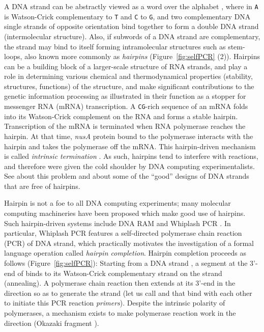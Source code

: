 \documentclass{article}
\theoremstyle{plain}
\theoremstyle{remark}
\begin{document}
A DNA strand can be abstractly viewed as a word over the alphabet , where in {\tt A} is Watson-Crick complementary to {\tt T} and {\tt C} to {\tt G}, and two complementary DNA single strands of opposite orientation bind together to form a double DNA strand (intermolecular structure). 
Also, if subwords of a DNA strand are complementary, the strand may bind to itself forming intramolecular structures such as stem-loops, also known more commonly as {\it hairpins} (Figure~\ref{fig:selfPCR} (2)). 
Hairpins can be a building block of a larger-scale structure of RNA strands, and play a role in determining various chemical and thermodynamical properties (stability, structures, functions) of the structure, and make significant contributions to the genetic information processing as illustrated in their function as a stopper for messenger RNA (mRNA) transcription. 
A {\tt CG}-rich sequence of an mRNA folds into its Watson-Crick complement on the RNA and forms a stable hairpin. 
Transcription of the mRNA is terminated when RNA polymerase reaches the hairpin. 
At that time, {\it nusA} protein bound to the polymerase interacts with the hairpin and takes the polymerase off the mRNA. 
This hairpin-driven mechanism is called {\it intrinsic termination} \cite{WilsonHippel95}. 
As such, hairpins tend to interfere with reactions, and therefore were given the cold shoulder by DNA computing experimentalists. 
See \cite{Adleman94, AritaKobayashi02, JoKeMa02, JonoskaMahalingam04, KaKoLoSoTh06, PaRoYo01} about this problem and about some of the ``good'' designs of DNA strands that are free of hairpins. 

Hairpin is not a foe to all DNA computing experiments; many molecular computing machineries have been proposed which make good use of hairpins. 
Such hairpin-driven systems include DNA RAM \cite{KaYaOhYaHa08, TakinoueSuyama04, TakinoueSuyama06} and Whiplash PCR \cite{HAKSY00, SKKGYISH99}. 
In particular, Whiplash PCR features a self-directed polymerase chain reaction (PCR) of DNA strand, which practically motivates the investigation of a formal language operation called {\it hairpin completion}. 
Hairpin completion proceeds as follows (Figure~\ref{fig:selfPCR}): 
Starting from a DNA strand , a segment  at the 3'-end of  binds to its Watson-Crick complementary strand  on the strand (annealing). 
A polymerase chain reaction then extends  at its 3'-end in the  direction so as to generate the strand  (let us call  and  that bind with each other to initiate this PCR reaction {\it primers}). 
Despite the intrinsic  polarity of polymerases, a mechanism exists to make polymerase reaction work in the  direction (Okazaki fragment \cite{OkOkSaSuSu68}). 
\end{document}
